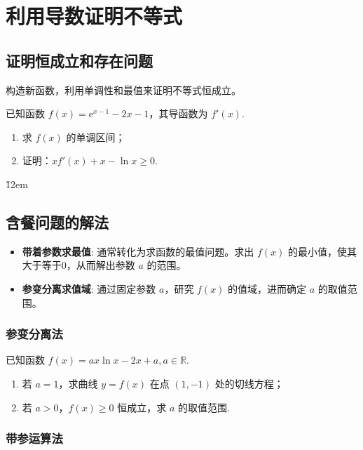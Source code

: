 \section{利用导数证明不等式}

\subsection{证明恒成立和存在问题}

\begin{theorem}[利用导数证明不等式]
    构造新函数，利用单调性和最值来证明不等式恒成立。
\end{theorem}
\begin{example}
    已知函数 $f(x) = \mathrm{e}^{x - 1} - 2x - 1$，其导函数为 $f'(x)$.
    \begin{enumerate}
        \item[(1)] 求 $f(x)$ 的单调区间；
        \item[(2)] 证明：$xf'(x) + x - \ln x \geq 0$.
    \end{enumerate}
\end{example}

\v{12em}

\subsection{含餐问题的解法}

\begin{theorem}[含参恒成立问题]
    \begin{itemize}
        \item \textbf{带着参数求最值}: 通常转化为求函数的最值问题。求出 $f(x)$ 的最小值，使其大于等于0，从而解出参数 $a$ 的范围。
        \item \textbf{参变分离求值域}: 通过固定参数 $a$，研究 $f(x)$ 的值域，进而确定 $a$ 的取值范围。
    \end{itemize}
\end{theorem}

\subsubsection{参变分离法}

\begin{example}
    已知函数 $f(x) = ax\ln x - 2x + a, a \in \mathbb{R}$.
    \begin{enumerate}
        \item[(1)] 若 $a = 1$，求曲线 $y = f(x)$ 在点 $(1, -1)$ 处的切线方程；
        \item[(2)] 若 $a > 0$，$f(x) \geq 0$ 恒成立，求 $a$ 的取值范围.
    \end{enumerate}
\end{example}

\subsubsection{带参运算法}
